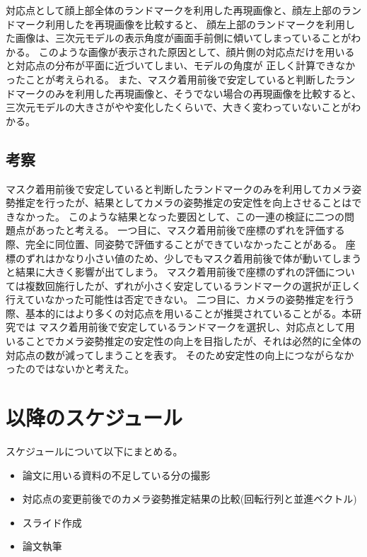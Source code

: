 \documentclass[]{jarticle}          %
\begin{document}
対応点として顔上部全体のランドマークを利用した再現画像と、顔左上部のランドマーク利用したを再現画像を比較すると、
顔左上部のランドマークを利用した画像は、三次元モデルの表示角度が画面手前側に傾いてしまっていることがわかる。
このような画像が表示された原因として、顔片側の対応点だけを用いると対応点の分布が平面に近づいてしまい、モデルの角度が
正しく計算できなかったことが考えられる。
また、マスク着用前後で安定していると判断したランドマークのみを利用した再現画像と、そうでない場合の再現画像を比較すると、
三次元モデルの大きさがやや変化したくらいで、大きく変わっていないことがわかる。

\subsection{考察}
マスク着用前後で安定していると判断したランドマークのみを利用してカメラ姿勢推定を行ったが、結果としてカメラの姿勢推定の安定性を向上させることはできなかった。
このような結果となった要因として、この一連の検証に二つの問題点があったと考える。
一つ目に、マスク着用前後で座標のずれを評価する際、完全に同位置、同姿勢で評価することができていなかったことがある。
座標のずれはかなり小さい値のため、少しでもマスク着用前後で体が動いてしまうと結果に大きく影響が出てしまう。
マスク着用前後で座標のずれの評価については複数回施行したが、ずれが小さく安定しているランドマークの選択が正しく行えていなかった可能性は否定できない。
二つ目に、カメラの姿勢推定を行う際、基本的にはより多くの対応点を用いることが推奨されていることがる。本研究では
マスク着用前後で安定しているランドマークを選択し、対応点として用いることでカメラ姿勢推定の安定性の向上を目指したが、それは必然的に全体の対応点の数が減ってしまうことを表す。
そのため安定性の向上につながらなかったのではないかと考えた。

\section{以降のスケジュール}
スケジュールについて以下にまとめる。\\
\begin{itemize}
  \item 論文に用いる資料の不足している分の撮影
  \item 対応点の変更前後でのカメラ姿勢推定結果の比較(回転行列と並進ベクトル)
  \item スライド作成
  \item 論文執筆
\end{itemize}
\end{document}
